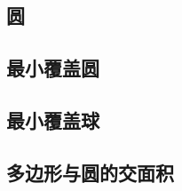 \documentclass[openany, a4paper, 10pt]{book}
\begin{document}
\begin{spacing}{1.0}
		\section{圆}
			\subsection{最小覆盖圆}
				
			\subsection{最小覆盖球}
				
			\subsection{多边形与圆的交面积}
				

\end{spacing}
\end{document}
